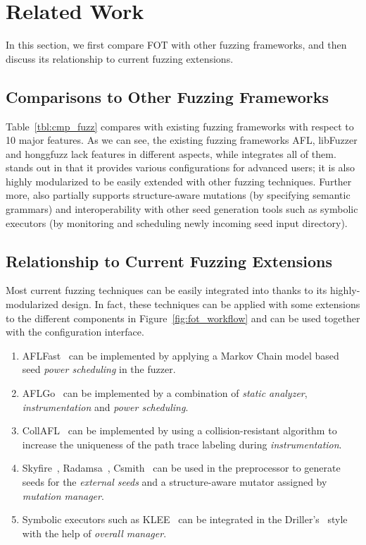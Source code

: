   

\section{Related Work}

In this section, we first compare FOT with other fuzzing frameworks, and then discuss its relationship to current fuzzing extensions.



\subsection{Comparisons to Other Fuzzing Frameworks}

Table~\ref{tbl:cmp_fuzz} compares {\FOT} with existing fuzzing frameworks with respect to 10 major features. As we can see, the existing fuzzing frameworks AFL, libFuzzer and honggfuzz lack features in different aspects, while {\FOT} integrates all of them. {\FOT} stands out in that it provides various configurations for advanced users; it is also highly modularized to be easily extended with other fuzzing techniques. Further more, {\FOT} also partially supports structure-aware mutations (by specifying semantic grammars) and interoperability with other seed generation tools such as symbolic executors (by monitoring and scheduling newly incoming seed input directory). 
\subsection{Relationship to Current Fuzzing Extensions}

Most current fuzzing techniques can be easily integrated into {\FOT} thanks to its highly-modularized design. In fact, these techniques can be applied with some extensions to the different components in Figure~\ref{fig:fot_workflow} and can be used together with the configuration interface. 

\begin{enumerate}[1)]
	\item AFLFast~\cite{Bohme:2016:CGF} can be implemented by applying a Markov Chain model based seed \emph{power scheduling} in the fuzzer. 
	\item AFLGo~\cite{Bohme:2017:DGF} can be implemented by a combination of \emph{static analyzer}, \emph{instrumentation} and \emph{power scheduling}.
	\item CollAFL~\cite{CollAFL} can be implemented by using a collision-resistant algorithm to increase the uniqueness of the path trace labeling during \emph{instrumentation}.
	\item Skyfire~\cite{junjie:2017sp:skyfire}, Radamsa~\cite{radamsa}, Csmith~\cite{csmith} can be used in the preprocessor to generate seeds for the \emph{external seeds} and a structure-aware mutator assigned by \emph{mutation manager}.
	\item Symbolic executors such as KLEE~\cite{klee} can be integrated in the Driller's~\cite{driller} style with the help of \emph{overall manager}.
\end{enumerate}

